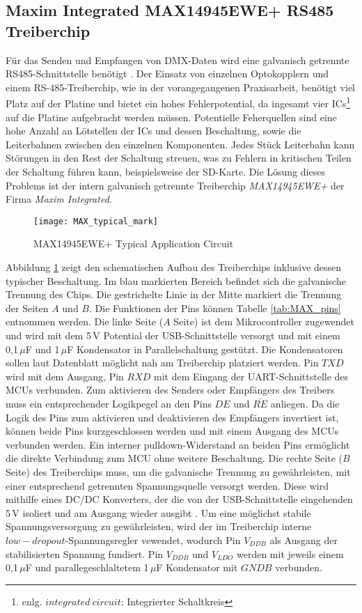 \newpage
\subsection{Maxim Integrated MAX14945EWE+ RS485 Treiberchip}

Für das Senden und Empfangen von DMX-Daten wird eine galvanisch getrennte RS485-Schnittstelle benötigt \cite[S.6-8]{Bauer2021}. Der Einsatz von einzelnen Optokopplern und einem RS-485-Treiberchip, wie in der vorangegangenen Praxisarbeit, benötigt viel Platz auf der Platine und bietet ein hohes Fehlerpotential, da ingesamt vier ICs\footnote{enlg. $integrated\ circuit$: Integrierter Schaltkreis} auf die Platine aufgebracht werden müssen. Potentielle Feherquellen sind eine hohe Anzahl an Lötstellen der ICs und dessen Beschaltung, sowie die Leiterbahnen zwischen den einzelnen Komponenten. Jedes Stück Leiterbahn kann Störungen in den Rest der Schaltung streuen, was zu Fehlern in kritischen Teilen der Schaltung führen kann, beispielsweise der SD-Karte. Die Lösung dieses Problems ist der intern galvanisch getrennte Treiberchip \textit{MAX14945EWE+} der Firma \textit{Maxim Integrated}.
\begin{figure}[h]
	\begin{center}
		\texttt{[image: MAX\_typical\_mark]}
		\caption{MAX14945EWE+ Typical Application Circuit \cite[s.19]{MAX14945MN}}
		\label{fig:MAXfd}
	\end{center}
\end{figure}
Abbildung \ref{fig:MAXfd} zeigt den schematischen Aufbau des Treiberchips inklusive dessen typischer Beschaltung. Im blau markierten Bereich befindet sich die galvanische Trennung des Chips. Die gestrichelte Linie in der Mitte markiert die Trennung der Seiten $A$ und $B$. Die Funktionen der Pins können Tabelle \ref{tab:MAX_pins} entnommen werden. Die linke Seite ($A$ Seite) ist dem Mikrocontroller zugewendet und wird mit dem 5\,V Potential der USB-Schnittstelle versorgt und mit einem 0,1\,$\mu$F und 1\,$\mu$F Kondensator in Parallelschaltung gestützt. Die Kondensatoren sollen laut Datenblatt möglicht nah am Treiberchip platziert werden. Pin $TXD$ wird mit dem Ausgang, Pin $RXD$ mit dem Eingang der UART-Schnittstelle des MCUs verbunden. Zum aktivieren des Senders oder Empfängers des Treibers muss ein entsprechender Logikpegel an den Pins $DE$ und $\overline{RE}$ anliegen. Da die Logik des Pins zum aktivieren und deaktivieren des Empfängers invertiert ist, können beide Pins kurzgeschlossen werden und mit einem Ausgang des MCUs verbunden werden. Ein interner pulldown-Widerstand an beiden Pins ermöglicht die direkte Verbindung zum MCU ohne weitere Beschaltung. Die rechte Seite ($B$ Seite) des Treiberchips muss, um die galvanische Trennung zu gewährleisten, mit einer entsprechend getrennten Spannungsquelle versorgt werden. Diese wird mithilfe eines DC/DC Konverters, der die von der USB-Schnittstelle eingehenden 5\,V isoliert und am Ausgang wieder ausgibt \cite{DC_MN}. Um eine möglichst stabile Spannungsversorgung zu gewährleisten, wird der im Treiberchip interne $low-dropout$-Spannungsregler vewendet, wodurch Pin $V_{DDB}$ als Ausgang der stabilisierten Spannung fundiert. Pin $V_{DDB}$ und $V_{LDO}$ werden mit jeweils einem 0,1\,$\mu$F und parallegeschlaltetem 1\,$\mu$F Kondensator mit $GNDB$ verbunden.
